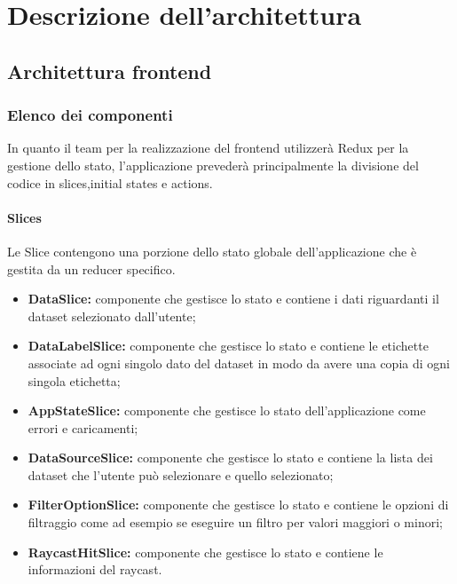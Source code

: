 \section{Descrizione dell'architettura}
\subsection{Architettura frontend}
\subsubsection{Elenco dei componenti}
In quanto il team per la realizzazione del frontend utilizzerà Redux per la gestione dello stato, l'applicazione
prevederà principalmente la divisione del codice in slices,initial states e actions.
    \paragraph{Slices}
        Le Slice contengono una porzione dello stato globale dell’applicazione che è gestita da un reducer
        specifico.
    \begin{itemize}
            \item \textbf{DataSlice:} componente che gestisce lo stato e contiene i dati riguardanti il dataset selezionato dall'utente;
            \item \textbf{DataLabelSlice:} componente che gestisce lo stato e contiene le etichette associate ad ogni singolo dato del dataset in modo da avere una copia di ogni singola etichetta;
            \item \textbf{AppStateSlice:} componente che gestisce lo stato dell'applicazione come errori e caricamenti;
            \item \textbf{DataSourceSlice:} componente che gestisce lo stato e contiene la lista dei dataset che l'utente può selezionare e quello selezionato;
            \item \textbf{FilterOptionSlice:} componente che gestisce lo stato e contiene le opzioni di filtraggio come ad esempio se eseguire un filtro per valori maggiori o minori;
            \item \textbf{RaycastHitSlice:} componente che gestisce lo stato e contiene le informazioni del raycast.
    \end{itemize}
